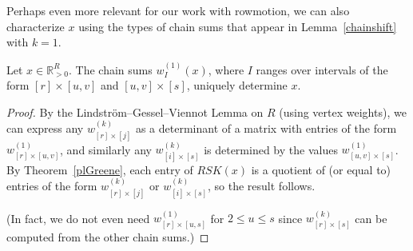 \documentclass[ALCO,Unicode,published]{cedram}
\numberwithin{equation}{section}
\begin{document}
Perhaps even more relevant for our work with rowmotion, we can also characterize $x$ using the types of chain sums that appear in Lemma~\ref{chainshift} with $k=1$.

\begin{Th} \label{thm:chainsums}
Let $x \in \mathbb{R}^R_{>0}$. The chain sums $w_I^{(1)}(x)$, where $I$ ranges over intervals of the form $[r] \times [u,v]$ and $[u,v] \times [s]$, uniquely determine $x$.
\end{Th}
\begin{proof}
By the Lindstr\"om--Gessel--Viennot Lemma on $R$ (using vertex weights), we can express any $w_{[r] \times [j]}^{(k)}$ as a determinant of a matrix with entries of the form $w_{[r] \times [u,v]}^{(1)}$, and similarly any $w_{[i] \times [s]}^{(k)}$  is determined by the values $w_{[u,v] \times [s]}^{(1)}$.
By Theorem~\ref{plGreene}, each entry of $RSK(x)$ is a quotient of (or equal to) entries of the form $w_{[r]\times[j]}^{(k)}$ or $w_{[i]\times[s]}^{(k)}$, so the result follows.

(In fact, we do not even need $w_{[r] \times [u,s]}^{(1)}$ for $2 \leq u \leq s$ since $w_{[r] \times [s]}^{(k)}$ can be computed from the other chain sums.)
\end{proof}



\end{document}

